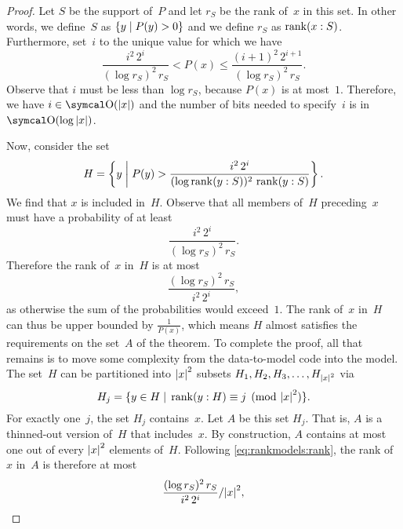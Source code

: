 \begin{proof}
  Let $S$ be the support of~$P$ and let $r_S$ be the rank of~$x$ in this set.
  In other words, we define~$S$ as $\{y \st P(y) > 0\}$ and we define $r_S$ as $\rank(x : S)$.
  Furthermore, set~$i$ to the unique value for which we have
  \begin{equation*}
    \frac{i^2\, 2^i}{(\log r_S)^2\, r_S} < P(x) \le \frac{(i + 1)^2\, 2^{i + 1}}{(\log r_S)^2\, r_S}.
  \end{equation*}
  Observe that $i$ must be less than $\log r_S$, because $P(x)$ is at most~$1$.
  Therefore, we have $i \in \bigO(\length{x})$ and the number of bits needed to specify~$i$ is in $\bigO(\log \length{x})$.

  Now, consider the set
  \begin{equation*}
    H \deq \left\{y \st[\middle] P(y) > \frac{i^2\, 2^i}{(\log \rank(y : S))^2\, \rank(y : S)}\right\}.
  \end{equation*}
  We find that $x$ is included in~$H$.
  Observe that all members of~$H$ preceding~$x$ must have a probability of at least
  \begin{equation*}
    \frac{i^2\, 2^i}{(\log r_S)^2\, r_S}.
  \end{equation*}
  Therefore the rank of~$x$ in~$H$ is at most
  \begin{equation}
  \label{eq:rankmodels:rank}
    \frac{(\log r_S)^2\, r_S}{i^2\, 2^i},
  \end{equation}
  as otherwise the sum of the probabilities would exceed~$1$.
  The rank of~$x$ in~$H$ can thus be upper bounded by $\frac{1}{P(x)}$, which means $H$ almost satisfies the requirements on the set~$A$ of the theorem.
  To complete the proof, all that remains is to move some complexity from the data-to-model code into the model.
  The set~$H$ can be partitioned into $\length{x}^2$ subsets $H_1, H_2, H_3, \ldots, H_{\length{x}^2}$ via
  \begin{equation*}
    H_j \deq \{y \in H \st \rank(y : H) \equiv j \pmod{\length{x}^2}\}.
  \end{equation*}
  For exactly one~$j$, the set $H_j$ contains~$x$.
  Let $A$ be this set $H_j$.
  That is, $A$ is a thinned-out version of~$H$ that includes~$x$.
  By construction, $A$ contains at most one out of every $\length{x}^2$ elements of~$H$.
  Following \eqref{eq:rankmodels:rank}, the rank of~$x$ in~$A$ is therefore at most
  \begin{equation*}
    \frac{(\log r_S)^2\, r_S}{i^2\, 2^i} / \length{x}^2,
  \end{equation*}

\end{proof}
